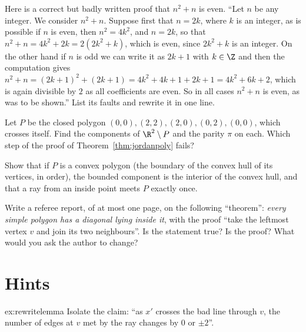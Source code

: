 \begin{exercise}[$\star\star$]\label{ex:badproof}
Here is a correct but badly written proof that $n^2+n$ is even. ``Let $n$ be any integer. We consider $n^2+n$. Suppose first that $n=2k$, where $k$ is an integer, as is possible if $n$ is even, then $n^2=4k^2$, and $n=2k$, so that $n^2+n=4k^2+2k=2(2k^2+k)$, which is even, since $2k^2+k$ is an integer. On the other hand if $n$ is odd we can write it as $2k+1$ with $k\in\Z$ and then the computation gives $n^2+n=(2k+1)^2+(2k+1)=4k^2+4k+1+2k+1=4k^2+6k+2$, which is again divisible by $2$ as all coefficients are even. So in all cases $n^2+n$ is even, as was to be shown.'' List its faults and rewrite it in one line.
\end{exercise}

\begin{exercise}[$\star\star$]\label{ex:figureeight}
Let $P$ be the closed polygon $(0,0),(2,2),(2,0),(0,2),(0,0)$, which crosses itself. Find the components of $\R^2\setminus P$ and the parity $\pi$ on each. Which step of the proof of Theorem~\ref{thm:jordanpoly} fails?
\end{exercise}

\begin{exercise}[$\star\star$]\label{ex:convexinside}
Show that if $P$ is a convex polygon (the boundary of the convex hull of its vertices, in order), the bounded component is the interior of the convex hull, and that a ray from an inside point meets $P$ exactly once.
\end{exercise}

\begin{exercise}[$\star\star\star$]\label{ex:referee}
Write a referee report, of at most one page, on the following ``theorem'': \emph{every simple polygon has a diagonal lying inside it}, with the proof ``take the leftmost vertex $v$ and join its two neighbours''. Is the statement true? Is the proof? What would you ask the author to change?
\end{exercise}

\section{Hints}

\begin{hint}{ex:rewritelemma}
Isolate the claim: ``as $x'$ crosses the bad line through $v$, the number of edges at $v$ met by the ray changes by $0$ or $\pm2$''.
\end{hint}

